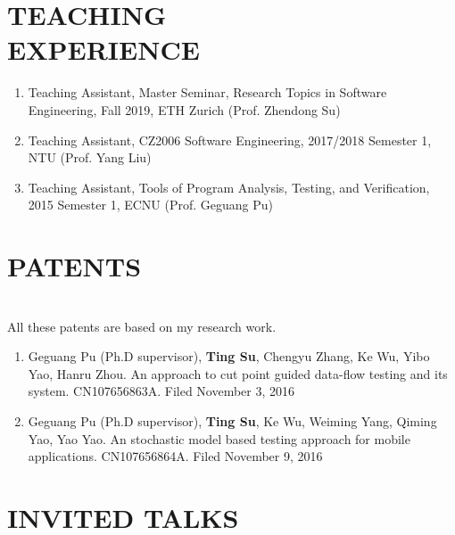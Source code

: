 \documentclass[margin]{res}
\begin{document}
\begin{resume}
\section{TEACHING\\EXPERIENCE}
\begin{enumerate}[leftmargin=*]
	\item Teaching Assistant, Master Seminar, Research Topics in Software Engineering, Fall 2019, ETH Zurich (Prof. Zhendong Su)
    \item Teaching Assistant, CZ2006 Software Engineering, 2017/2018 Semester 1, NTU (Prof. Yang Liu)
    \item Teaching Assistant, Tools of Program Analysis, Testing, and Verification, 2015 Semester 1, ECNU (Prof. Geguang Pu)
\end{enumerate}


\section{PATENTS}
\\
All these patents are based on my research work.
\begin{enumerate}[leftmargin=*]
    \item Geguang Pu (Ph.D supervisor), \textbf{Ting Su}, Chengyu Zhang, Ke Wu, Yibo Yao, Hanru Zhou. An approach to cut point guided data-flow testing and its system. CN107656863A. Filed November 3, 2016
    \item Geguang Pu (Ph.D supervisor), \textbf{Ting Su}, Ke Wu, Weiming Yang, Qiming Yao, Yao Yao. An stochastic model based testing approach for mobile applications. CN107656864A. Filed November 9, 2016
\end{enumerate}

\section{INVITED TALKS}
\begin{itemize}[leftmargin=*]
   

\end{itemize}
\end{resume}
\end{document}
